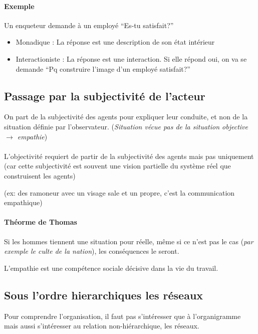 \documentclass[11pt]{article} %
\begin{document}
\paragraph{Exemple}
Un enqueteur demande à un employé ``Es-tu satisfait?''
\begin{itemize}
    \item Monadique : La réponse est une description de son état
        intérieur
    \item Interactioniste : La réponse est une interaction. Si elle
        répond oui, on va se demande ``Pq construire l'image d'un
        employé satisfait?''
\end{itemize}


\subsection{Passage par la subjectivité de l'acteur}
On part de la subjectivité des agents pour expliquer leur conduite, et
non de la situation définie par l'observateur.
(\textit{Situation vécue pas de la situation objective $\to$ empathie})

\paragraph{ }L'objectivité requiert de partir de la subjectivité des
agents mais pas uniquement (car cette subjectivité est souvent une
vision partielle du système réel que construisent les agents)

(ex: des ramoneur avec un visage sale et un propre, c'est la
communication empathique)

\paragraph{Théorme de Thomas} 

Si les hommes tiennent une situation pour réelle, même si ce n'est pas
le cas (\textit{par exemple le culte de la nation}), les conséquences
le seront. 

L'empathie est une compétence sociale décisive dans la vie du travail.

\subsection{Sous l'ordre hierarchiques les réseaux}
Pour comprendre l'organisation, il faut pas s'intéresser que à
l'organigramme mais aussi s'intéresser au relation
non-hiérarchique, les réseaux.
\end{document}
